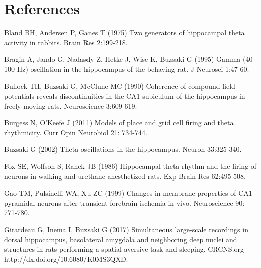 \documentclass[12pt, letterpaper]{article}
\newenvironment{collapsable}{}{}
\begin{document}
\newpage
\begin{collapsable}
  \section*{\center\normalfont\normalsize\bf References}

  \noindent Bland BH, Andersen P, Ganes T (1975) Two generators of hippocampal theta
  activity in rabbits. Brain Res 2:199-218.

  \vspace{12pt}

  \noindent Bragin A, Jando G, Nadasdy Z, Hetke J, Wise K, Buzsaki G (1995) Gamma
  (40-100 Hz) oscillation in the hippocampus of the behaving rat. J Neurosci
  1:47-60.

  \vspace{12pt}

  \noindent Bullock TH, Buzsaki G, McClune MC (1990) Coherence of compound field
  potentials reveals discontinuities in the CA1-subiculum of the hippocampus
  in freely-moving rats. Neuroscience 3:609-619.

  \vspace{12pt}

  \noindent Burgess N, O'Keefe J (2011) Models of place and grid cell firing and theta
  rhythmicity. Curr Opin Neurobiol 21: 734-744.

  \vspace{12pt}

  \noindent Buzsaki G (2002) Theta oscillations in the hippocampus. Neuron 33:325-340.

  \vspace{12pt}

  \noindent Fox SE, Wolfson S, Ranck JB (1986) Hippocampal theta rhythm and the firing
  of neurons in walking and urethane anesthetized rats. Exp Brain Res
  62:495-508.

  \vspace{12pt}

  \noindent Gao TM, Pulsinelli WA, Xu ZC (1999) Changes in membrane properties of CA1
  pyramidal neurons after transient forebrain ischemia in vivo. Neuroscience
  90: 771-780.

  \vspace{12pt}

  \noindent Girardeau G, Inema I, Buzsaki G (2017) Simultaneous large-scale recordings
  in dorsal hippocampus, basolateral amygdala and neighboring deep nuclei and
  structures in rats performing a spatial aversive task and sleeping.
  CRCNS.org  http://dx.doi.org/10.6080/K0MS3QXD.


\end{collapsable}
\end{document}
